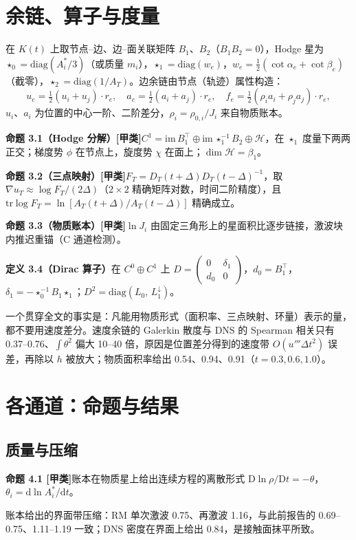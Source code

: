 \documentclass[11pt,a4paper]{article}
\newcommand{\prop}[2]{\par\smallskip\noindent\textbf{#1}\quad #2\par\smallskip}
\newcommand{\jia}{[甲类]}\newcommand{\yi}{[乙类]}\newcommand{\bing}{[丙类]}
\begin{document}
\section{余链、算子与度量}
在 $K(t)$ 上取节点–边、边–面关联矩阵 $B_1$、$B_2$（$B_1B_2=0$），Hodge 星为 $\star_0=\mathrm{diag}(A^*_i/3)$（或质量 $m_i$），$\star_1=\mathrm{diag}(w_e)$，$w_e=\tfrac12(\cot\alpha_e+\cot\beta_e)$（截零），$\star_2=\mathrm{diag}(1/A_T)$。边余链由节点（轨迹）属性构造：
\begin{equation}
u_e=\tfrac12(u_i+u_j)\cdot r_e,\quad a_e=\tfrac12(a_i+a_j)\cdot r_e,\quad f_e=\tfrac12(\rho_ia_i+\rho_ja_j)\cdot r_e ,
\end{equation}
$u_i$、$a_i$ 为位置的中心一阶、二阶差分，$\rho_i=\rho_{0,i}/J_i$ 来自物质账本。
\prop{命题 3.1（Hodge 分解）\jia}{$C^1=\mathrm{im}\,B_1^{\top}\oplus\mathrm{im}\,\star_1^{-1}B_2\oplus\mathcal H$，在 $\star_1$ 度量下两两正交；梯度势 $\phi$ 在节点上，旋度势 $\chi$ 在面上；$\dim\mathcal H=\beta_1$。}
\prop{命题 3.2（三点映射）\jia}{$F_T=D_T(t+\Delta)D_T(t-\Delta)^{-1}$，取 $\nabla u_T\approx\log F_T/(2\Delta)$（$2\times2$ 精确矩阵对数，时间二阶精度），且 $\mathrm{tr}\log F_T=\ln[A_T(t+\Delta)/A_T(t-\Delta)]$ 精确成立。}
\prop{命题 3.3（物质账本）\jia}{$\ln J_i$ 由固定三角形上的星面积比逐步链接，激波块内推迟重锚（C 通道检测）。}
\prop{定义 3.4（Dirac 算子）}{在 $C^0\oplus C^1$ 上 $D=\begin{pmatrix}0&\delta_1\\ d_0&0\end{pmatrix}$，$d_0=B_1^{\top}$，$\delta_1=-\star_0^{-1}B_1\star_1$；$D^2=\mathrm{diag}(L_0,\,L_1^{\downarrow})$。}

\noindent 一个贯穿全文的事实是：凡能用物质形式（面积率、三点映射、环量）表示的量，都不要用速度差分。速度余链的 Galerkin 散度与 DNS 的 Spearman 相关只有 0.37–0.76、$\int\theta^2$ 偏大 10–40 倍，原因是位置差分得到的速度带 $O(u'''\Delta t^2)$ 误差，再除以 $h$ 被放大；物质面积率给出 0.54、0.94、0.91（$t=0.3,0.6,1.0$）。

\section{各通道：命题与结果}
\subsection{质量与压缩}
\prop{命题 4.1 \jia}{账本在物质星上给出连续方程的离散形式 $\mathrm{D}\ln\rho/\mathrm{D}t=-\theta$，$\theta_i=\mathrm{d}\ln A^*_i/\mathrm{d}t$。}
账本给出的界面带压缩：RM 单次激波 0.75、再激波 1.16，与此前报告的 0.69–0.75、1.11–1.19 一致；DNS 密度在界面上给出 0.84，是接触面抹平所致。
\end{document}
